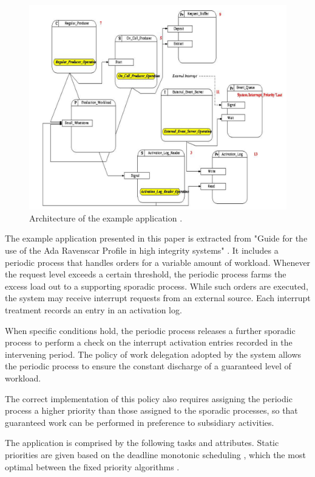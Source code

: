 \documentclass{article}
\begin{document}
\begin{figure}[!htbp]
\centering
\includegraphics[width=5in]{images/ycs}
\caption{Architecture of the example application \cite{ycs}.}
\label{ycs}
\end{figure}

The example application presented in this paper is extracted from "Guide for the use of the
Ada Ravenscar Profile in
high integrity systems" \cite{ycs}. It includes a periodic process that handles orders for a variable amount of workload. Whenever the request level exceeds a certain threshold, the periodic process farms the excess load out to a supporting sporadic process. While such orders are executed, the system may receive interrupt requests from an external source. Each interrupt treatment records an entry in an activation log.

When specific conditions hold, the periodic process releases a further sporadic process to perform a check on the interrupt activation entries recorded in the intervening period. The policy of work delegation adopted by the system allows the periodic process to ensure the constant discharge of a guaranteed level of workload.

The correct implementation of this policy also requires assigning the periodic process a higher priority than those assigned to the sporadic processes, so that guaranteed work can be performed in preference to subsidiary activities.

The application is comprised by the following tasks and attributes. Static priorities are given based on the deadline monotonic scheduling \cite{rm-dm}, which the most optimal between the fixed priority algorithms \cite{optimality-rm-dm}.
\end{document}
